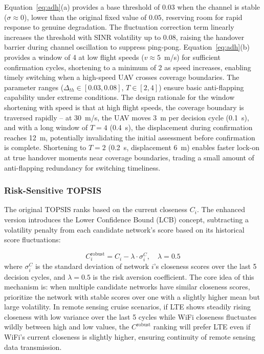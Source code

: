 \documentclass[journal,article,submit,moreauthors]{Definitions/mdpi}
\begin{document}
Equation~\eqref{eq:adh}(a) provides a base threshold of $0.03$ when the channel is stable ($\sigma \approx 0$), lower than the original fixed value of $0.05$, reserving room for rapid response to genuine degradation. The fluctuation correction term linearly increases the threshold with SINR volatility up to $0.08$, raising the handover barrier during channel oscillation to suppress ping-pong. Equation~\eqref{eq:adh}(b) provides a window of 4 at low flight speeds ($v \approx 5$~m/s) for sufficient confirmation cycles, shortening to a minimum of 2 as speed increases, enabling timely switching when a high-speed UAV crosses coverage boundaries. The parameter ranges ($\Delta_{th} \in [0.03, 0.08]$, $T \in [2, 4]$) ensure basic anti-flapping capability under extreme conditions. The design rationale for the window shortening with speed is that at high flight speeds, the coverage boundary is traversed rapidly -- at 30~m/s, the UAV moves 3~m per decision cycle (0.1~s), and with a long window of $T = 4$ (0.4~s), the displacement during confirmation reaches 12~m, potentially invalidating the initial assessment before confirmation is complete. Shortening to $T = 2$ (0.2~s, displacement 6~m) enables faster lock-on at true handover moments near coverage boundaries, trading a small amount of anti-flapping redundancy for switching timeliness.

\subsubsection{Risk-Sensitive TOPSIS}

The original TOPSIS ranks based on the current closeness $C_i$. The enhanced version introduces the Lower Confidence Bound (LCB) concept, subtracting a volatility penalty from each candidate network's score based on its historical score fluctuations:

\begin{equation}
C_i^{\text{robust}} = C_i - \lambda \cdot \sigma_i^C, \quad \lambda = 0.5
\label{eq:rstopsis}
\end{equation}
where $\sigma_i^C$ is the standard deviation of network $i$'s closeness scores over the last 5 decision cycles, and $\lambda = 0.5$ is the risk aversion coefficient. The core idea of this mechanism is: when multiple candidate networks have similar closeness scores, prioritize the network with stable scores over one with a slightly higher mean but large volatility. In remote sensing cruise scenarios, if LTE shows steadily rising closeness with low variance over the last 5 cycles while WiFi closeness fluctuates wildly between high and low values, the $C^{\text{robust}}$ ranking will prefer LTE even if WiFi's current closeness is slightly higher, ensuring continuity of remote sensing data transmission.
\end{document}
